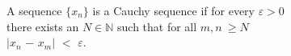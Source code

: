 \documentclass[preview]{standalone}
\begin{document}
\begin{center}
A sequence $\{x_n\}$ is a Cauchy sequence if for every $\varepsilon > 0$\\there exists an $N$$\in \mathbb{N}$ such that for all $m, n\:$$ \geq$$N$\\$|$$x_n$ $-$ $x_m$$|$ $<$ $\varepsilon$.
\end{center}
\end{document}
